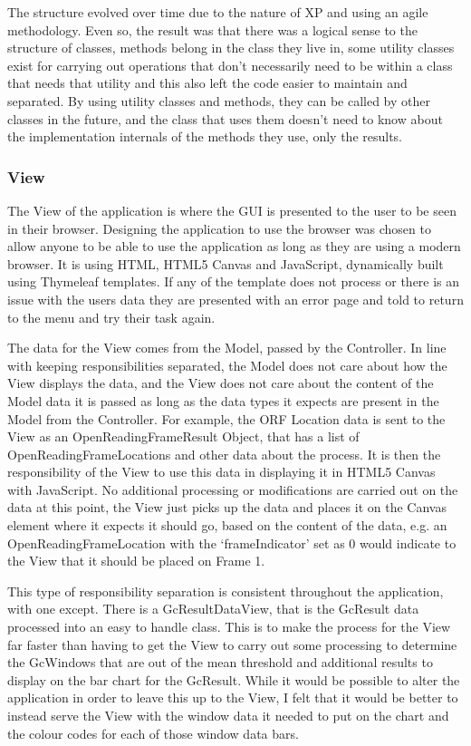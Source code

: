 The structure evolved over time due to the nature of XP and using an agile methodology. Even so, the result was that there was a logical sense to the structure of classes, methods belong in the class they live in, some utility classes exist for carrying out operations that don't necessarily need to be within a class that needs that utility and this also left the code easier to maintain and separated. By using utility classes and methods, they can be called by other classes in the future, and the class that uses them doesn't need to know about the implementation internals of the methods they use, only the results.

\subsubsection{View}
The View of the application is where the GUI is presented to the user to be seen in their browser. Designing the application to use the browser was chosen to allow anyone to be able to use the application as long as they are using a modern browser. It is using HTML, HTML5 Canvas and JavaScript, dynamically built using Thymeleaf templates. If any of the template does not process or there is an issue with the users data they are presented with an error page and told to return to the menu and try their task again.

The data for the View comes from the Model, passed by the Controller. In line with keeping responsibilities separated, the Model does not care about how the View displays the data, and the View does not care about the content of the Model data it is passed as long as the data types it expects are present in the Model from the Controller. For example, the ORF Location data is sent to the View as an OpenReadingFrameResult Object, that has a list of OpenReadingFrameLocations and other data about the process. It is then the responsibility of the View to use this data in displaying it in HTML5 Canvas with JavaScript. No additional processing or modifications are carried out on the data at this point, the View just picks up the data and places it on the Canvas element where it expects it should go, based on the content of the data, e.g. an OpenReadingFrameLocation with the `frameIndicator' set as 0 would indicate to the View that it should be placed on Frame 1.

This type of responsibility separation is consistent throughout the application, with one except. There is a GcResultDataView, that is the GcResult data processed into an easy to handle class. This is to make the process for the View far faster than having to get the View to carry out some processing to determine the GcWindows that are out of the mean threshold and additional results to display on the bar chart for the GcResult. While it would be possible to alter the application in order to leave this up to the View, I felt that it would be better to instead serve the View with the window data it needed to put on the chart and the colour codes for each of those window data bars.

